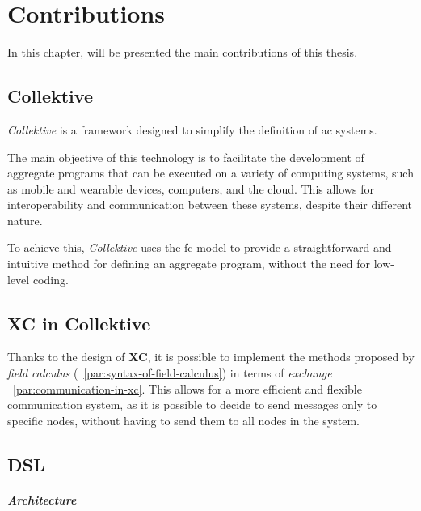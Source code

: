 
\chapter{Contributions}
\label{ch:contributions}
In this chapter, will be presented the main contributions of this thesis.

\section{Collektive}
\label{sec:collektive}

\emph{Collektive} is a framework designed to simplify the definition of \ac{ac} systems.

The main objective of this technology is to facilitate the development of aggregate programs that can be executed on a
variety of computing systems, such as mobile and wearable devices, computers, and the cloud.
This allows for interoperability and communication between these systems, despite their different nature.

To achieve this, \emph{Collektive} uses the \ac{fc} model to provide a straightforward and intuitive method for defining
an aggregate program, without the need for low-level coding.

\section{XC in Collektive}
\label{sec:exchange-in-collektive}

Thanks to the design of \textbf{XC}, it is possible to implement the methods proposed by \emph{field calculus}
(~\ref{par:syntax-of-field-calculus}) in terms of \emph{exchange} ~\ref{par:communication-in-xc}.
This allows for a more efficient and flexible communication system, as it is possible to decide to send messages only to
specific nodes, without having to send them to all nodes in the system.


\section{DSL}
\label{sec:dsl}


\paragraph{Architecture}

